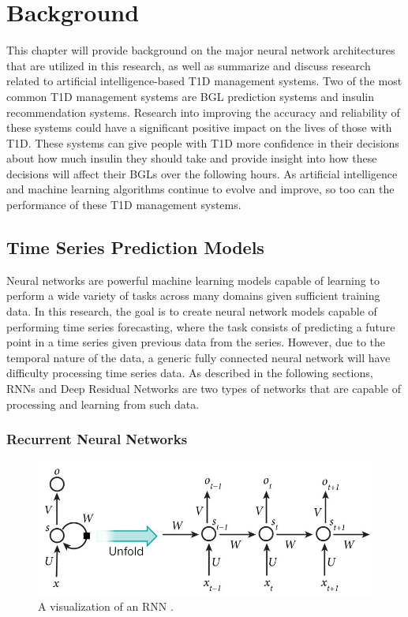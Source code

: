 \chapter{Background}
\label{chapter:background}

This chapter will provide background on the major neural network architectures that are utilized in this research, as well as summarize and discuss research related to artificial intelligence-based \ac{T1D} management systems. Two of the most common \ac{T1D} management systems are \ac{BGL} prediction systems and insulin recommendation systems. Research into improving the accuracy and reliability of these systems could have a significant positive impact on the lives of those with \ac{T1D}. These systems can give people with \ac{T1D} more confidence in their decisions about how much insulin they should take and provide insight into how these decisions will affect their \ac{BGLs} over the following hours. As artificial intelligence and machine learning algorithms continue to evolve and improve, so too can the performance of these \ac{T1D} management systems.

\section{Time Series Prediction Models}
\label{section:time_series}

Neural networks are powerful machine learning models capable of learning to perform a wide variety of tasks across many domains given sufficient training data. In this research, the goal is to create neural network models capable of performing time series forecasting, where the task consists of predicting a future point in a time series given previous data from the series. However, due to the temporal nature of the data, a generic fully connected neural network will have difficulty processing time series data. As described in the following sections, \ac{RNNs} and Deep Residual Networks are two types of networks that are capable of processing and learning from such data.

\subsection{Recurrent Neural Networks}
\label{section:rnn}

\begin{figure}[t]
    \includegraphics[width=\textwidth]{rnn}
    \caption{A visualization of an RNN \cite{lecun2015deep}.}
    \label{fig:rnn}
\end{figure}

